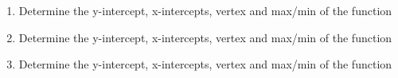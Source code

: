 \documentclass{article}
\begin{document}
\begin{minipage}[c]{0.45\textwidth}
    \vspace{-4cm}
    \begin{enumerate}
        
        \item Determine the y-intercept,
        x-intercepts, vertex and max/min of the function
        \vspace{5cm}

        \item Determine the y-intercept,
        x-intercepts, vertex and max/min of the function
        \vspace{5cm}

        \item Determine the y-intercept,
        x-intercepts, vertex and max/min of the function   


    \end{enumerate}
\end{minipage}%
\hfill
\end{document}
